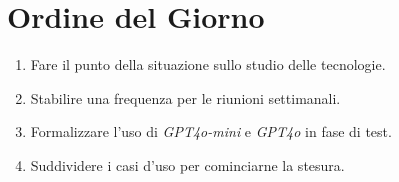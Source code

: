 
\section{Ordine del Giorno}

\begin{enumerate}
    \item Fare il punto della situazione sullo studio delle tecnologie.
    \item Stabilire una frequenza per le riunioni settimanali.
    \item Formalizzare l'uso di \emph{GPT4o-mini} e \emph{GPT4o} in fase di test.
    \item Suddividere i casi d'uso per cominciarne la stesura.
\end{enumerate}
